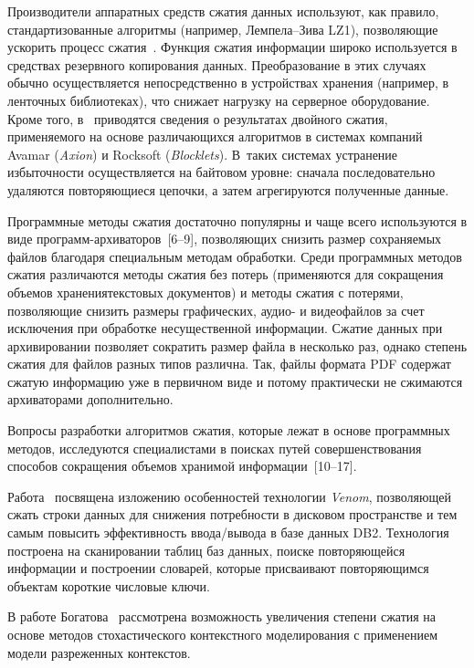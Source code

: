 \begin{multicols}{2}
     Производители аппаратных средств сжатия данных используют, как 
правило, стандартизованные алгоритмы (например, Лемпела--Зива LZ1), позволяющие 
ускорить процесс сжатия~\cite{7che, 9che}. Функция сжатия информации 
широко используется в средствах резервного копирования данных. 
Преобразование в этих случаях обычно осуществляется непосредственно в 
устройствах хранения (например, в ленточных биб\-лио\-те\-ках), что снижает 
нагрузку на серверное обору\-до\-ва\-ние. Кроме того, в~\cite{13che} приводятся 
сведения о результатах двойного сжатия, применяемого на основе 
различающихся алгоритмов в системах компаний Avamar (\textit{Axion}) и 
Rocksoft (\textit{Blocklets}). В~таких системах устранение избыточности 
осуществляется на байтовом уровне: сначала последовательно удаляются 
повторяющиеся цепочки, а затем агрегируются полученные данные.
     
     Программные методы сжатия достаточно популярны и чаще всего 
используются в виде программ-ар\-хи\-ва\-то\-ров~[6--9], 
позволяющих снизить размер сохраняемых файлов благодаря специальным 
методам обработки. Среди программных методов сжатия различаются методы 
сжатия без потерь (применяются для сокращения объемов хранения\linebreak текстовых 
документов) и методы сжатия с потерями, позволяющие снизить размеры 
графических, аудио- и видеофайлов за счет исключения при обработке 
несущественной информации. Сжатие данных при архивировании позволяет 
сократить размер файла в несколько раз, однако степень сжатия для файлов 
разных типов различна. Так, файлы формата PDF содержат сжатую информацию 
уже в первичном виде и потому практически не сжимаются архиваторами 
дополнительно.
     
     Вопросы разработки алгоритмов сжатия, которые лежат в основе 
программных методов, исследуются специалистами в поисках путей 
совершенствования способов сокращения объемов хранимой 
информации~[10--17].
     
     Работа~\cite{1che} посвящена изложению особенностей технологии 
\textit{Venom}, позволяющей сжать строки данных для снижения потребности в 
дисковом пространстве и тем самым повысить эффективность ввода/вывода в 
базе данных DB2. Технология построена на сканировании таблиц баз данных, 
поиске повторяющейся информации и построении словарей, которые 
присваивают повторяющимся объектам короткие числовые ключи.
     
     В работе Богатова~\cite{3che} рассмотрена возможность 
увеличения степени сжатия на основе методов стохастического контекстного 
моделирования с применением модели разреженных контекстов.
     

\end{multicols}
